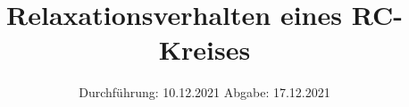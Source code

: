 

\subject{VERSUCH 353}
\title{Relaxationsverhalten eines RC-Kreises}
\date{%
  Durchführung: 10.12.2021
  \hspace{3em}
  Abgabe: 17.12.2021
}



\maketitle
\thispagestyle{empty}
\tableofcontents
\newpage






\printbibliography{}


